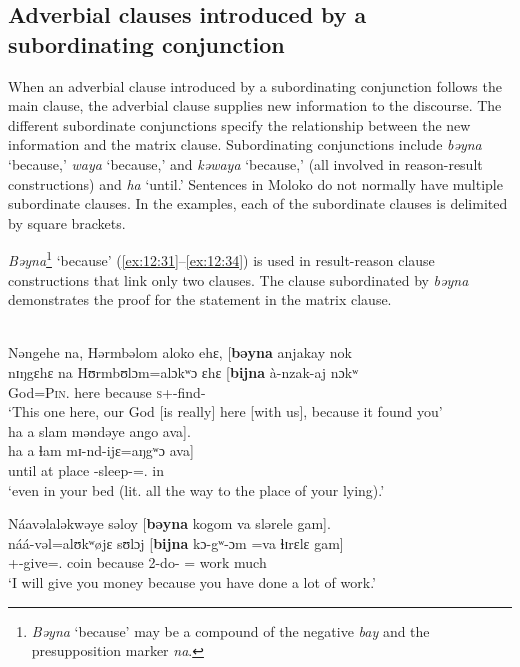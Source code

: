 \subsection{Adverbial clauses introduced by a subordinating conjunction}\label{sec:12.3.1}
\hypertarget{RefHeading1213441525720847}{}
When an adverbial clause introduced by a subordinating conjunction follows the main clause, the adverbial clause supplies new information to the discourse. The different subordinate conjunctions specify the relationship between the new information and the matrix clause. Subordinating conjunctions include \textit{bəyna} ‘because,’ \textit{ waya} ‘because,’ and \textit{kəwaya} ‘because,’ (all involved in reason-result constructions) and \textit{ha} ‘until.’ Sentences in Moloko do not normally have multiple subordinate clauses. In the examples, each of the subordinate clauses is delimited by square brackets.  

\textit{Bəyna}\footnote{\textit{Bəyna} ‘because’ may be a compound of the negative \textit{bay} and the presupposition marker \textit{na}. }  ‘because’ (\ref{ex:12:31}--\ref{ex:12:34}) is used in result-reason clause constructions that link only two clauses. The clause subordinated by \textit{bəyna} demonstrates the proof for the statement in the matrix clause. 

\clearpage
\ea \label{ex:12:31}
\\
Nəngehe  na,   Hərmbəlom  aloko  ehɛ,  [\textbf{bəyna}  anjakay  nok\\ 
\gll  nɪŋgɛhɛ na   Hʊrmbʊlɔm=alɔkʷɔ  ɛhɛ  [\textbf{bijna} à-nzak-aj  nɔkʷ \\ 
      {\DEM}     {\PSP}       God=\textsc{Pin}.{\POSS}   here      because   \textsc{s}+{\PFV}-find{}-{\CL}  {\twoS} \\    
\glt ‘This one here, our God [is really] here [with us], because it found you’\\      
      
      \medskip
ha  a  slam  məndəye  ango  ava].\\      
\gll ha a ɬam mɪ-nd-ijɛ=aŋgʷɔ ava]\\
     until  at    place  {\NOM}{}-sleep-{\CL}={\twoS}.{\POSS}  in\\
\glt  ‘even in your bed (lit. all the way to the place of your lying).’ 
\z 

\ea \label{ex:12:32}
Náavəlaləkwəye  səloy  [\textbf{bəyna}  kogom  va  slərele  gam].\\
\gll  náá-vəl=alʊkʷøjɛ   sʊlɔj     [\textbf{bijna}  kɔ-gʷ{}-ɔm =va  ɬɪrɛlɛ  gam]\\
      {\oneS}+{\POT}-give={\twoP}.{\IO}  coin    because  2-do-{\twoP}  ={\PRF}  work  much\\
\glt  ‘I will give you money because you have done a lot of work.’
\z  

